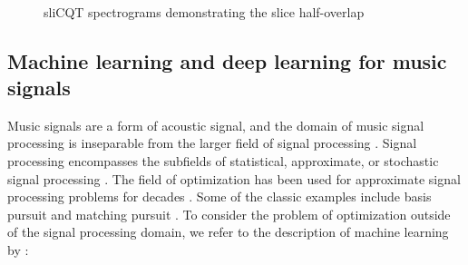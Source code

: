 \documentclass[report.tex]{subfiles}
\begin{document}
\begin{figure}[ht]
	\centering
	\\
	\caption{sliCQT spectrograms demonstrating the slice half-overlap}
	\label{fig:slicqoverlaps}
\end{figure}

\newpagefill

\subsection{Machine learning and deep learning for music signals}
\label{sec:ml}

Music signals are a form of acoustic signal, and the domain of music signal processing is inseparable from the larger field of signal processing \parencite{musicsp}. Signal processing encompasses the subfields of statistical, approximate, or stochastic signal processing \parencite{stochasticsp, statisticalsp}. The field of optimization has been used for approximate signal processing problems for decades \parencite{optsp}. Some of the classic examples include basis pursuit and matching pursuit \parencite{dictionary1, dictionary2}. To consider the problem of optimization outside of the signal processing domain, we refer to the description of machine learning by \citeauthor{introtoml}:
\end{document}
